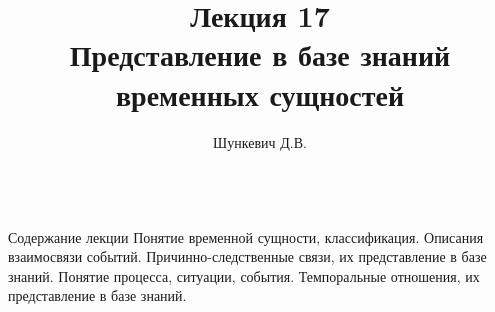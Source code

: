 \title{Лекция 17\\Представление в базе знаний временных сущностей}
\author[]{Шункевич Д.В.}

\begin{frame}
	\titlepage
\end{frame}

\begin{frame}{\\Содержание лекции}
	\topline
	\justifying
	Понятие временной сущности, классификация. Описания взаимосвязи событий. Причинно-следственные связи, их представление в базе знаний. Понятие процесса, ситуации, события. Темпоральные отношения, их представление в базе знаний.
\end{frame}